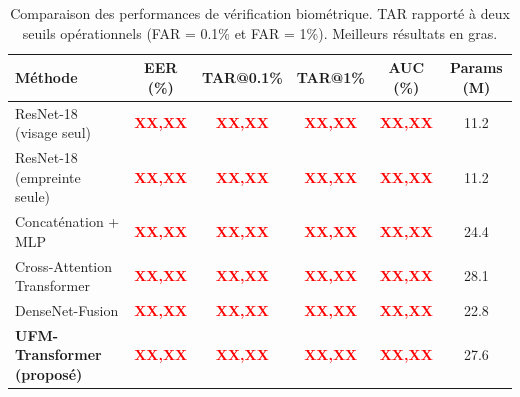 \documentclass[12pt,a4paper]{report}
\begin{document}
\begin{table}[htbp]
    \centering
    \caption{Comparaison des performances de v\'{e}rification biom\'{e}trique. TAR rapport\'{e} \`{a} deux seuils op\'{e}rationnels (FAR = 0.1\% et FAR = 1\%). Meilleurs r\'{e}sultats en gras.}
    \label{tab:resultats-principaux}
    \begin{tabular}{lccccc}
        \hline
        \hline
        \textbf{M\'{e}thode} & \textbf{EER (\%)} & \textbf{TAR@0.1\%} & \textbf{TAR@1\%} & \textbf{AUC (\%)} & \textbf{Params (M)} \\
        \hline
        ResNet-18 (visage seul) & \textcolor{red}{\textbf{XX,XX}} & \textcolor{red}{\textbf{XX,XX}} & \textcolor{red}{\textbf{XX,XX}} & \textcolor{red}{\textbf{XX,XX}} & 11.2 \\
        ResNet-18 (empreinte seule) & \textcolor{red}{\textbf{XX,XX}} & \textcolor{red}{\textbf{XX,XX}} & \textcolor{red}{\textbf{XX,XX}} & \textcolor{red}{\textbf{XX,XX}} & 11.2 \\
        Concat\'{e}nation + MLP & \textcolor{red}{\textbf{XX,XX}} & \textcolor{red}{\textbf{XX,XX}} & \textcolor{red}{\textbf{XX,XX}} & \textcolor{red}{\textbf{XX,XX}} & 24.4 \\
        Cross-Attention Transformer & \textcolor{red}{\textbf{XX,XX}} & \textcolor{red}{\textbf{XX,XX}} & \textcolor{red}{\textbf{XX,XX}} & \textcolor{red}{\textbf{XX,XX}} & 28.1 \\
        DenseNet-Fusion \cite{huang2017densely} & \textcolor{red}{\textbf{XX,XX}} & \textcolor{red}{\textbf{XX,XX}} & \textcolor{red}{\textbf{XX,XX}} & \textcolor{red}{\textbf{XX,XX}} & 22.8 \\
        \rowcolor{gray!15}
        \textbf{UFM-Transformer (propos\'{e})} & \textcolor{red}{\textbf{XX,XX}} & \textcolor{red}{\textbf{XX,XX}} & \textcolor{red}{\textbf{XX,XX}} & \textcolor{red}{\textbf{XX,XX}} & 27.6 \\
        \hline
        \hline
    \end{tabular}
\end{table}

\end{document}
